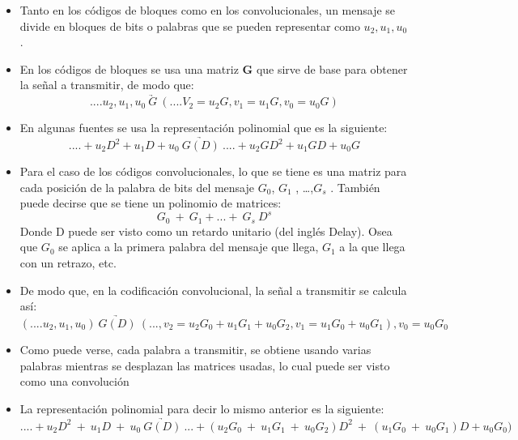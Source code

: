 \begin{itemize}
    \item Tanto en los códigos de bloques como en los convolucionales, un mensaje se divide en bloques de bits o palabras que se pueden representar como $u_{2}, u_{1} , u_{0}$.
    \item En los códigos de bloques se usa una matriz \textbf{G}  que sirve de base para obtener la señal a transmitir, de modo que:
    \begin{equation} \label{capsiete_diesiocho}
    .... u_{2}, u_{1} , u_{0} \ \underrightarrow{G} \ (.... V_{2} = u_{2}G , v_{1} = u_{1}G, v_{0}=u_{0}G )
     \end{equation}
     \item En algunas fuentes se usa la representación polinomial que es la siguiente:
    \begin{equation} \label{capsiete_diesinueve}
    .... + u_{2} D^{2} +  u_{1}D + u_{0} \ \underrightarrow{G(D)} \ .... + u_{2}G D^{2} +  u_{1}GD + u_{0}G 
     \end{equation}
     \item Para el caso de los códigos convolucionales, lo que se tiene es una matriz para cada posición de la palabra de bits del mensaje $G_{0}$, $G_{1}$ , …,$G_{s}$ . También puede decirse que se tiene un polinomio de matrices: 
    \begin{equation} \label{capsiete_veinte}
    G_{0} \ + \ G_{1} + ... + \ G_{s} \ D^{s}
     \end{equation}
     Donde D puede ser visto como un retardo unitario (del inglés Delay). Osea que $G_{0}$ se aplica a la primera palabra del mensaje que llega, $G_{1}$ a la que llega con un retrazo, etc.
     \item De modo que, en la codificación convolucional, la señal a transmitir se calcula así:
    \begin{equation} \label{capsiete_veintiuno}
    (....u_{2},u_{1},u_{0}) \ \underrightarrow{G(D)} \ 
    (..., v_{2}= u_{2} G_{0} +u_{1}G_{1}+u_{0}G_{2},v_{1}=u_{1}G_{0}+u_{0}G_{1}),v_{0}=u_{0}G_{0}
     \end{equation}
     
     \item Como puede verse, cada palabra a transmitir, se obtiene usando varias palabras mientras se desplazan las matrices usadas, lo cual puede ser visto como una  convolución
     \item La representación polinomial para decir lo mismo anterior es la siguiente:
    \begin{equation} \label{capsiete_veintidos}
    ....+ u_{2}D^{2} \ + \ u_{1}D \ + \ u_{0} \ \underrightarrow{G(D)} \ 
    ... + (u_{2}G_{0} \ + \ u_{1}G_{1} \ + \ u_{0}G_{2})D^{2} \ + \ (u_{1}G_{0} \ + \ u_{0}G_{1})D + u_{0}G_{0}   )
     \end{equation}
     

\end{itemize}
